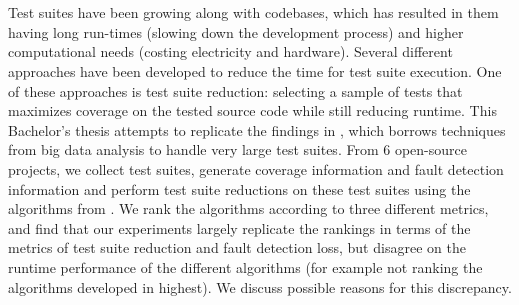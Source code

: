 \chapter{\abstractname}

Test suites have been growing along with codebases, which has resulted
in them having long run-times (slowing down the development process) and
higher computational needs (costing electricity and hardware). Several
different approaches have been developed to reduce the time for test suite
execution. One of these approaches is test suite reduction: selecting a
sample of tests that maximizes coverage on the tested source code while
still reducing runtime. This Bachelor's thesis attempts to replicate the
findings in \cite{cruciani2019scalable}, which borrows techniques from
big data analysis to handle very large test suites. From 6 open-source
projects, we collect test suites, generate coverage information and
fault detection information and perform test suite reductions on these
test suites using the algorithms from \cite{cruciani2019scalable}. We
rank the algorithms according to three different metrics, and find that
our experiments largely replicate the rankings in terms of the metrics
of test suite reduction and fault detection loss, but disagree on the
runtime performance of the different algorithms (for example not ranking
the algorithms developed in \cite{cruciani2019scalable} highest). We
discuss possible reasons for this discrepancy.
